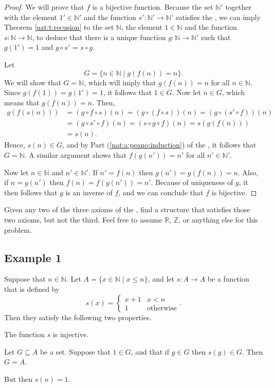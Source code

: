 \begin{proof}
	We will prove that $f$ is a bijective function. Because the set $\mathbb{N}'$ together with the element $1' \in \mathbb{N}'$ and the function $s': \mathbb{N}' \to \mathbb{N}'$ satisfies the , we can imply Theorem \ref{nat:t:recusion} to the set $\mathbb{N}$, the element $1 \in \mathbb{N}$ and the function $s: \mathbb{N} \to \mathbb{N}$, to deduce that there is a unique function $g: \mathbb{N} \to \mathbb{N}'$ such that $g(1') = 1$ and $g \circ s'$ = $s \circ g$.

	Let
	\[
		G = \{ n \in \mathbb{N} \mid g(f(n)) = n \}.
	\]
	We will show that $G = \mathbb{N}$, which will imply that $g(f(n)) = n$ for all $n \in \mathbb{N}$. Since ${g(f(1)) = g(1') = 1}$, it follows that $1 \in G$. Now let $n \in G$, which means that $g(f(n)) = n$. Then,
	\begin{align*}
		g(f(s(n))) & = (g \circ f \circ s)(n) = (g \circ (f \circ s))(n) = (g \circ (s' \circ f))(n) \\
		           & = (g \circ s' \circ f)(n) = (s \circ g \circ f)(n) = s(g(f(n)))                 \\
		           & = s(n).
	\end{align*}
	Hence, $s(n) \in G$, and by Part (\ref{nat:a:peano:induction}) of the , it follows that $G = \mathbb{N}$. A similar argument shows that $f(g(n')) = n'$ for all $n' \in \mathbb{N}'$.

	Now let $n \in \mathbb{N}$ and $n' \in \mathbb{N}'$. If $n' = f(n)$ then $g(n') = g(f(n)) = n$. Also, if $n = g(n')$ then $f(n) = f(g(n')) = n'$. Because of uniqueness of $g$, it then follows that $g$ is an inverse of $f$, and we can conclude that $f$ is bijective.
\end{proof}


\Newpage
\begin{exercise} %
	Given any two of the three axioms of the , find a structure that satisfies those two axioms, but not the third. Feel free to assume $\mathbb{R}$, $\mathbb{Z}$, or anything else for this problem.
\end{exercise}

\subsection*{Example 1}
Suppose that $n \in \mathbb{N}$. Let $A = \{ x \in \mathbb{N} \mid x \leq n \}$, and let $s: A \to A$ be a function that is defined by
\[
	s(x) = \begin{cases}
		x + 1 & x < n            \\
		1     & \text{otherwise}
	\end{cases}.
\]
Then they satisfy the following two properties.
\begin{lenumerate}
	\item The function $s$ is injective.
	\item Let $G \subseteq A$ be a set. Suppose that $1 \in G$, and that if $g \in G$ then $s(g) \in G$. Then
	      $G = A$.
\end{lenumerate}
But then $s(n) = 1$.

